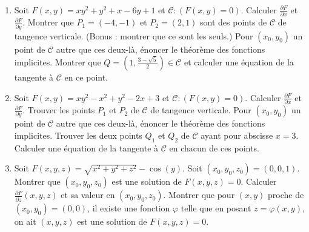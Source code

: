 \documentclass[11pt, class=report,crop=false]{standalone}
\begin{document}
\begin{miniexercices}
\sauteligne
\begin{enumerate}
    
  \item Soit $F(x,y)=xy^2+y^2+x-6y+1$ et $\mathcal{C} : (F(x,y)=0)$. 
  Calculer $\frac{\partial F}{\partial x}$ et $\frac{\partial F}{\partial y}$.
  Montrer que $P_1 = (-4,-1)$ et $P_2 = (2,1)$ sont des points de $\mathcal{C}$ de tangence verticale. (Bonus : montrer que ce sont les seuls.) 
  Pour $(x_0,y_0)$ un point de $\mathcal{C}$ autre que ces deux-là, énoncer le théorème des fonctions implicites.
  Montrer que $Q = (1,\frac{3-\sqrt5}{2}) \in \mathcal{C}$ et calculer une équation de la tangente à $\mathcal{C}$ en ce point.
  
  \item Soit $F(x,y)=xy^2-x^2+y^2-2x+3$ et $\mathcal{C} : (F(x,y)=0)$. 
  Calculer $\frac{\partial F}{\partial x}$ et $\frac{\partial F}{\partial y}$.
  Trouver les points $P_1$ et $P_2$ de $\mathcal{C}$ de tangence verticale.
  Pour $(x_0,y_0)$ un point de $\mathcal{C}$ autre que ces deux-là, énoncer le théorème des fonctions implicites.
  Trouver les deux points $Q_1$ et $Q_2$ de $\mathcal{C}$ ayant pour abscisse $x=3$. Calculer  
   une équation de la tangente à $\mathcal{C}$ en chacun de ces points.
  
  \item Soit $F(x,y,z) = \sqrt{x^2+y^2+z^2}-\cos(y)$.
  Soit $(x_0,y_0,z_0)=(0,0,1)$. 
  Montrer que $(x_0,y_0,z_0)$ est une solution de $F(x,y,z)=0$.
  Calculer $\frac{\partial F}{\partial z}(x,y,z)$ et sa valeur en $(x_0,y_0,z_0)$.
  Montrer que pour $(x,y)$ proche de $(x_0,y_0)=(0,0)$, il existe une fonction $\varphi$
  telle que en posant $z=\varphi(x,y)$, on ait $(x,y,z)$ est une solution de $F(x,y,z)=0$.
  
\end{enumerate}
\end{miniexercices}





\finchapitre 
\end{document}
